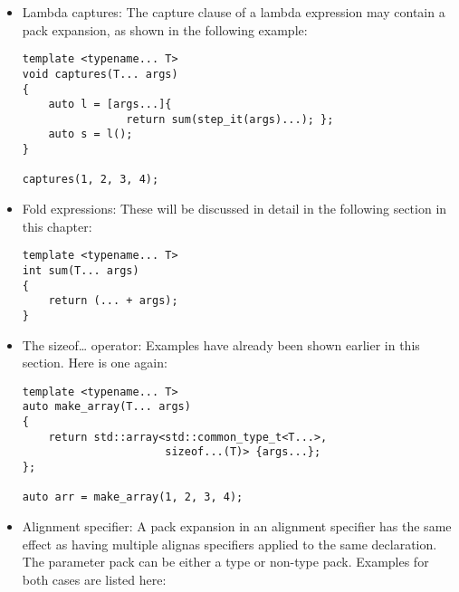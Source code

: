 \begin{itemize}
\begin{lstlisting}[style=styleCXX]
struct A
{
	void execute() { std::cout << "A::execute\n"; }
};

struct B
{
	void execute() { std::cout << "B::execute\n"; }
};

struct C
{
	void execute() { std::cout << "C::execute\n"; }
};

template<typename... Bases>
struct X : public Bases...
{
	X(Bases const & ... args) : Bases(args)...
	{}
	
	using Bases::execute...;
};

A a;
B b;
C c;
X x(a, b, c);

x.A::execute();
x.B::execute();
x.C::execute();
\end{lstlisting}

\item
Lambda captures: The capture clause of a lambda expression may contain a pack expansion, as shown in the following example:

\begin{lstlisting}[style=styleCXX]
template <typename... T>
void captures(T... args)
{
	auto l = [args...]{
		        return sum(step_it(args)...); };
	auto s = l();
}

captures(1, 2, 3, 4);
\end{lstlisting}

\item
Fold expressions: These will be discussed in detail in the following section in this chapter:

\begin{lstlisting}[style=styleCXX]
template <typename... T>
int sum(T... args)
{
	return (... + args);
}
\end{lstlisting}

\item
The sizeof… operator: Examples have already been shown earlier in this section. Here is one again:

\begin{lstlisting}[style=styleCXX]
template <typename... T>
auto make_array(T... args)
{
	return std::array<std::common_type_t<T...>,
	                  sizeof...(T)> {args...};
};

auto arr = make_array(1, 2, 3, 4);
\end{lstlisting}

\item
Alignment specifier: A pack expansion in an alignment specifier has the same effect as having multiple alignas specifiers applied to the same declaration. The parameter pack can be either a type or non-type pack. Examples for both cases are listed here:


\end{itemize}

